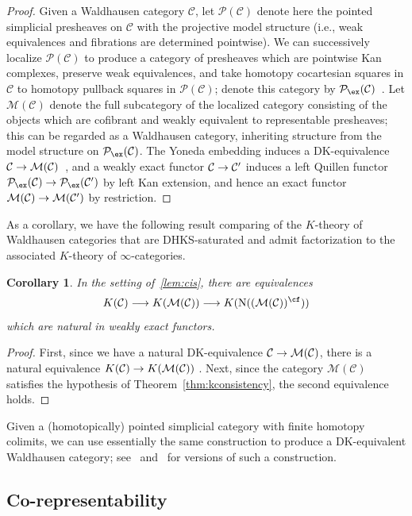 \documentclass{amsart}
\renewcommand{\to}{\mathchoice{\longrightarrow}{\rightarrow}{\rightarrow}{\rightarrow}}
\let\catsymbfont\mathcal
\newcommand{\aC}{{\catsymbfont{C}}}
\newcommand{\aM}{{\catsymbfont{M}}}
\newcommand{\aP}{{\catsymbfont{P}}}
\newcommand{\N}{\mathrm{N}}
\renewcommand{\i}{\infty}
\numberwithin{equation}{section}
\newtheorem{corollary}[equation]{Corollary}
\theoremstyle{definition}
\begin{document}
\begin{proof}
Given a Waldhausen category $\aC$, let $\aP(\aC)$ denote here the
pointed simplicial presheaves on $\aC$ with the projective model
structure (i.e., weak equivalences and fibrations are determined
pointwise).  We can successively localize $\aP(\aC)$ to produce a
category of presheaves which are pointwise Kan complexes, preserve
weak equivalences, and take homotopy cocartesian squares in $\aC$ to
homotopy pullback squares in $\aP(\aC)$; denote this category by
$\aP_{\ex}(\aC)$~\cite[4.10]{Cisinski}.  Let $\aM(\aC)$ denote the
full subcategory of the localized category consisting of the objects
which are cofibrant and weakly equivalent to representable presheaves;
this can be regarded as a Waldhausen category, inheriting structure
from the model structure on $\aP_{\ex}(\aC)$.  The Yoneda embedding
induces a DK-equivalence $\aC \to \aM(\aC)$~\cite[4.11]{Cisinski}, and
a weakly exact functor $\aC \to \aC'$ induces a left Quillen functor
$\aP_{\ex}(\aC) \to \aP_{\ex}(\aC')$ by left Kan extension, and hence
an exact functor $\aM(\aC) \to \aM(\aC')$ by restriction.
\end{proof}

As a corollary, we have the following result comparing of the
$K$-theory of Waldhausen categories that are DHKS-saturated and admit
factorization to the associated $K$-theory of $\i$-categories.

\begin{corollary}\label{cor:gencomp}
In the setting of~\ref{lem:cis}, there are equivalences
\[
K(\aC) \to K(\aM(\aC)) \to K(\N((\aM(\aC))^{\cf}))
\]
which are natural in weakly exact functors.
\end{corollary}

\begin{proof}
First, since we have a natural DK-equivalence $\aC \to \aM(\aC)$,
there is a natural equivalence $K(\aC) \to K(\aM(\aC))$ \cite{BM4,
Cisinski, ToenVezzosi}.  Next, since the category $\aM(\aC)$ satisfies
the hypothesis of Theorem~\ref{thm:kconsistency}, the second
equivalence holds.
\end{proof}

Given a (homotopically) pointed simplicial category with finite
homotopy colimits, we can use essentially the same construction to
produce a DK-equivalent Waldhausen category; see~\cite[\S
5]{ToenVezzosi} and~\cite[\S 14]{BM} for versions of such a
construction.

\subsection{Co-representability}
\end{document}

